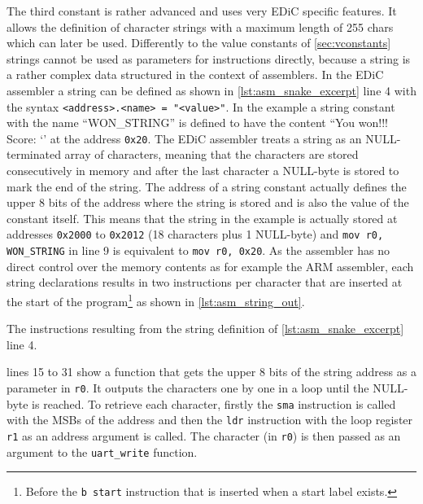 The third constant is rather advanced and uses very \gls{EDiC} specific features.
It allows the definition of character strings with a maximum length of 255 chars which can later be used.
Differently to the value constants of \cref{sec:vconstants} strings cannot be used as parameters for instructions directly, because a string is a rather complex data structured in the context of assemblers.
In the \gls{EDiC} assembler a string can be defined as shown in \cref{lst:asm_snake_excerpt} line 4 with the syntax \texttt{<address>.<name> = "<value>"}.
In the example a string constant with the name ``WON\_STRING'' is defined to have the content ``You won!!! Score: `' at the address \texttt{0x20}.
The \gls{EDiC} assembler treats a string as an NULL-terminated array of characters, meaning that the characters are stored consecutively in memory and after the last character a NULL-byte is stored to mark the end of the string.
The address of a string constant actually defines the upper 8 bits of the address where the string is stored and is also the value of the constant itself.
This means that the string in the example is actually stored at addresses \texttt{0x2000} to \texttt{0x2012} (18 characters plus 1 NULL-byte) and \texttt{mov r0, WON_STRING} in line 9 is equivalent to \texttt{mov r0, 0x20}.
As the assembler has no direct control over the memory contents as for example the ARM assembler, each string declarations results in two instructions per character that are inserted at the start of the program\footnote{Before the \texttt{b start} instruction that is inserted when a start label exists.} as shown in \cref{lst:asm_string_out}.

\begin{listing}[t]
  \caption{The instructions resulting from the string definition of \cref{lst:asm_snake_excerpt} line 4.}
  \label{lst:asm_string_out}
\end{listing}
 lines 15 to 31 show a function that gets the upper 8 bits of the string address as a parameter in \texttt{r0}.
It outputs the characters one by one in a loop until the NULL-byte is reached.
To retrieve each character, firstly the \texttt{sma} instruction is called with the \glspl{MSB} of the address and then the \texttt{ldr} instruction with the loop register \texttt{r1} as an address argument is called.
The character (in \texttt{r0}) is then passed as an argument to the \texttt{uart\_write} function.


